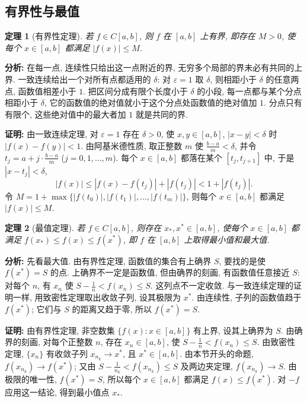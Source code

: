 \documentclass[UTF8,openany]{ctexbook}
\theoremstyle{chinesetextbook}
\newtheorem{theorem}{定理}[section]
\newenvironment{cnproof}{\par\indent\textbf{证明:} \ignorespaces}{\par}
\begin{document}
\subsection{有界性与最值}
\begin{theorem}[有界性定理]
若 $f\in C[a,b]$, 则 $f$ 在 $[a,b]$ 上有界, 即存在 $M>0$, 使每个 $x\in[a,b]$ 都满足 $|f(x)|\le M$.
\end{theorem}
\par\indent\textbf{分析:} 在每一点, 连续性只给出这一点附近的界, 无穷多个局部的界未必有共同的上界. 一致连续给出一个对所有点都适用的 $\delta$: 对 $\varepsilon=1$ 取 $\delta$, 则相距小于 $\delta$ 的任意两点, 函数值相差小于 $1$. 把区间分成有限个长度小于 $\delta$ 的小段, 每一点都与某个分点相距小于 $\delta$, 它的函数值的绝对值就小于这个分点处函数值的绝对值加 $1$. 分点只有有限个, 这些绝对值中的最大者加 $1$ 就是共同的界.
\begin{cnproof}
由一致连续定理, 对 $\varepsilon=1$ 存在 $\delta>0$, 使 $x,y\in[a,b]$, $|x-y|<\delta$ 时 $|f(x)-f(y)|<1$. 由阿基米德性质, 取正整数 $m$ 使 $\displaystyle\frac{b-a}m<\delta$, 并令 $\displaystyle t_j=a+j\cdot\frac{b-a}m$ ($j=0,1,\ldots,m$). 每个 $x\in[a,b]$ 都落在某个 $[t_j,t_{j+1}]$ 中, 于是 $|x-t_j|<\delta$,
\[
|f(x)|\le|f(x)-f(t_j)|+|f(t_j)|<1+|f(t_j)|.
\]
令 $M=1+\max\{|f(t_0)|,|f(t_1)|,\ldots,|f(t_m)|\}$, 则每个 $x\in[a,b]$ 都满足 $|f(x)|\le M$.
\end{cnproof}
\begin{theorem}[最值定理]
若 $f\in C[a,b]$, 则存在 $x_*,x^*\in[a,b]$, 使每个 $x\in[a,b]$ 都满足 $f(x_*)\le f(x)\le f(x^*)$, 即 $f$ 在 $[a,b]$ 上取得最小值和最大值.
\end{theorem}
\par\indent\textbf{分析:} 先看最大值. 由有界性定理, 函数值的集合有上确界 $S$, 要找的是使 $f(x^*)=S$ 的点. 上确界不一定是函数值, 但由确界的刻画, 有函数值任意接近 $S$: 对每个 $n$, 有 $x_n$ 使 $\displaystyle S-\frac1n<f(x_n)\le S$. 这列点不一定收敛. 与一致连续定理的证明一样, 用致密性定理取出收敛子列, 设其极限为 $x^*$. 由连续性, 子列的函数值趋于 $f(x^*)$; 它们与 $S$ 的距离又趋于零, 所以 $f(x^*)=S$.
\begin{cnproof}
由有界性定理, 非空数集 $\{f(x):x\in[a,b]\}$ 有上界, 设其上确界为 $S$. 由确界的刻画, 对每个正整数 $n$, 存在 $x_n\in[a,b]$, 使 $\displaystyle S-\frac1n<f(x_n)\le S$. 由致密性定理, $\{x_n\}$ 有收敛子列 $x_{n_k}\to x^*$, 且 $x^*\in[a,b]$. 由本节开头的命题, $f(x_{n_k})\to f(x^*)$; 又由 $\displaystyle S-\frac1{n_k}<f(x_{n_k})\le S$ 及两边夹定理, $f(x_{n_k})\to S$. 由极限的唯一性, $f(x^*)=S$, 所以每个 $x\in[a,b]$ 都满足 $f(x)\le f(x^*)$. 对 $-f$ 应用这一结论, 得到最小值点 $x_*$.
\end{cnproof}
\end{document}
